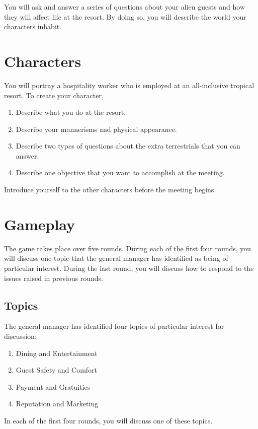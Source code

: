 \documentclass[a6paper, 11pt, parskip=half, DIV=15]{scrartcl}
\begin{document}
\vfill

You will ask and answer a series of questions about your alien guests and how they will affect life at the resort. By doing so, you will describe the world your characters inhabit.

\newpage
\enlargethispage{1.75\baselineskip}

\section*{Characters}
You will portray a hospitality worker who is employed at an all-inclusive tropical resort. To create your character,
\begin{enumerate}[nosep]
	\item Describe what you do at the resort.
	\item Describe your mannerisms and physical appearance.
	\item Describe two types of questions about the extra terrestrials that you can answer.
	\item Describe one objective that you want to accomplish at the meeting.
\end{enumerate}
Introduce yourself to the other characters before the meeting begins.

\section*{Gameplay}
The game takes place over five rounds. 
During each of the first four rounds, you will discuss one topic that the general manager has identified as being of particular interest.
During the last round, you will discuss how to respond to the issues raised in previous rounds. 

\newpage
\enlargethispage{1.75\baselineskip}

\subsection*{Topics}
The general manager has identified four topics of particular interest for discussion:
\begin{enumerate}[nosep]
	\item Dining and Entertainment
	\item Guest Safety and Comfort
	\item Payment and Gratuities
	\item Reputation and Marketing
\end{enumerate}
In each of the first four rounds, you will discuss one of these topics.
\end{document}
